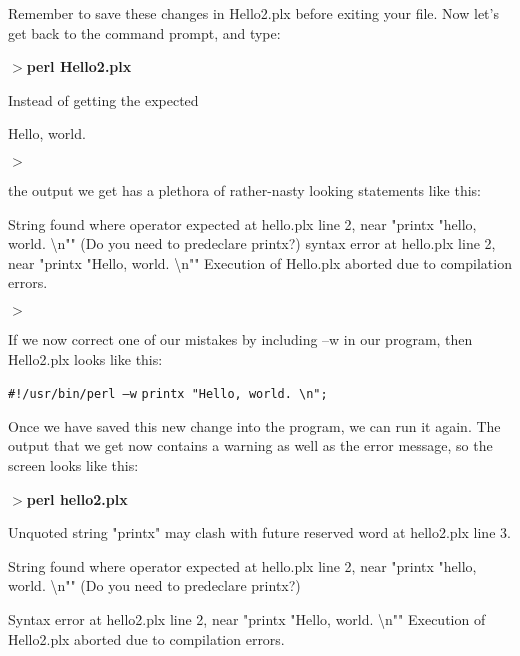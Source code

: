\documentclass[a4paper,11pt]{book}
\begin{document}
\noindent

\noindent Remember to save these changes in Hello2.plx before exiting your file. Now let's get back to the command prompt, and type:

\noindent 

\noindent \textbf{$>$perl Hello2.plx}

\noindent 

\noindent Instead of getting the expected

\noindent 

\noindent Hello, world.

\noindent $>$

\noindent 

\noindent the output we get has a plethora of rather-nasty looking statements like this:

\noindent 

\noindent String found where operator expected at hello.plx line 2, near "printx "hello, world. \textbackslash n"" (Do you need to predeclare printx?) syntax error at hello.plx line 2, near "printx "Hello, world. \textbackslash n"" Execution of Hello.plx aborted due to compilation errors.

\noindent $>$

\noindent 

\noindent If we now correct one of our mistakes by including --w in our program, then Hello2.plx looks like this:

\noindent 

\noindent \texttt{\#!/usr/bin/perl --w}
\noindent \texttt{printx "Hello, world. \textbackslash n";}

\noindent 

\noindent Once we have saved this new change into the program, we can run it again. The output that we get now contains a warning as well as the error message, so the screen looks like this:

\noindent 

\noindent \textbf{$>$perl hello2.plx}

\noindent 

\noindent Unquoted string "printx" may clash with future reserved word at hello2.plx line 3.

\noindent String found where operator expected at hello.plx line 2, near "printx "hello, world. \textbackslash n"" (Do you need to predeclare printx?)

\noindent Syntax error at hello2.plx line 2, near "printx "Hello, world. \textbackslash n"" Execution of Hello2.plx aborted due to compilation errors.
\end{document}
